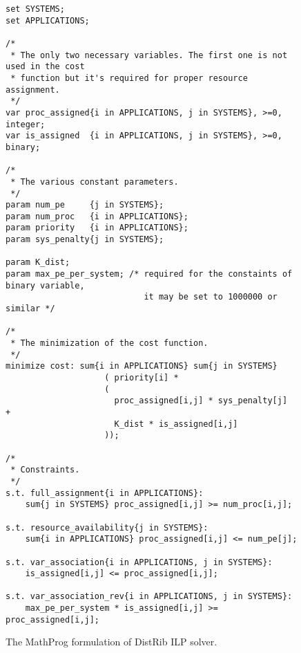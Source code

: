 \begin{figure}[t]
\begin{lstlisting}[style=customc]
set SYSTEMS;
set APPLICATIONS;

/* 
 * The only two necessary variables. The first one is not used in the cost
 * function but it's required for proper resource assignment.
 */
var proc_assigned{i in APPLICATIONS, j in SYSTEMS}, >=0, integer;
var is_assigned  {i in APPLICATIONS, j in SYSTEMS}, >=0, binary;

/* 
 * The various constant parameters.
 */
param num_pe     {j in SYSTEMS};
param num_proc   {i in APPLICATIONS};
param priority   {i in APPLICATIONS};
param sys_penalty{j in SYSTEMS};

param K_dist;
param max_pe_per_system; /* required for the constaints of binary variable,
                            it may be set to 1000000 or similar */

/* 
 * The minimization of the cost function.
 */
minimize cost: sum{i in APPLICATIONS} sum{j in SYSTEMS} 
                    ( priority[i] * 
                    (
                      proc_assigned[i,j] * sys_penalty[j]  + 
                      K_dist * is_assigned[i,j] 
                    ));

/* 
 * Constraints.
 */
s.t. full_assignment{i in APPLICATIONS}:
    sum{j in SYSTEMS} proc_assigned[i,j] >= num_proc[i,j];

s.t. resource_availability{j in SYSTEMS}:
    sum{i in APPLICATIONS} proc_assigned[i,j] <= num_pe[j];

s.t. var_association{i in APPLICATIONS, j in SYSTEMS}:
    is_assigned[i,j] <= proc_assigned[i,j];

s.t. var_association_rev{i in APPLICATIONS, j in SYSTEMS}:
    max_pe_per_system * is_assigned[i,j] >= proc_assigned[i,j];

\end{lstlisting}
\renewcommand\figurename{Listing}
\caption{The MathProg formulation of DistRib ILP solver.}
\label{app2:mathprog}
\end{figure}
